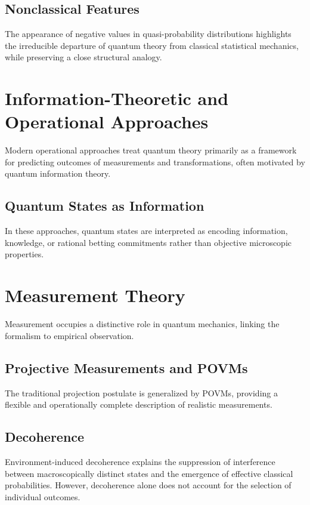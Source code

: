 \subsection{Nonclassical Features}

The appearance of negative values in quasi-probability distributions highlights 
the irreducible departure of quantum theory from classical statistical mechanics,
while preserving a close structural analogy.

\section{Information-Theoretic and Operational Approaches}

Modern operational approaches treat quantum theory primarily as a framework
for predicting outcomes of measurements and transformations, often 
motivated by quantum information theory.

\subsection{Quantum States as Information}

In these approaches, quantum states are interpreted as encoding information,
knowledge, or rational betting commitments rather than 
objective microscopic properties.

\section{Measurement Theory}

Measurement occupies a distinctive role in quantum mechanics,
linking the formalism to empirical observation.

\subsection{Projective Measurements and POVMs}

The traditional projection postulate is generalized by POVMs, providing a 
flexible and operationally complete description of realistic measurements.

\subsection{Decoherence}

Environment-induced decoherence explains the suppression of interference between 
macroscopically distinct states and the emergence of effective classical probabilities. 
However, decoherence alone does not account for the selection of individual outcomes.

